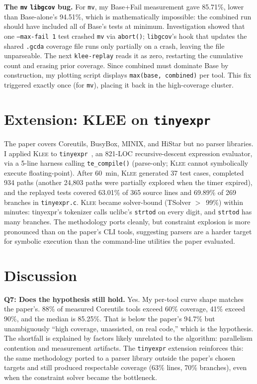 \documentclass[sigconf,nonacm,10pt]{acmart}
\newcommand{\Q}[2]{\textbf{Q#1: #2.}\;}
\begin{document}
\textbf{The \texttt{mv} \texttt{libgcov} bug.} For \texttt{mv}, my
Base+Fail measurement gave 85.71\%, lower than Base-alone's
94.51\%, which is mathematically impossible: the combined run
should have included all of Base's tests at minimum. Investigation showed
that one \texttt{--max-fail 1} test crashed \texttt{mv} via
\texttt{abort()}; \texttt{libgcov}'s hook that updates the shared
\texttt{.gcda} coverage file runs only partially on a crash,
leaving the file unparseable. The next \texttt{klee-replay} reads
it as zero, restarting the cumulative count and erasing prior
coverage. Since combined must dominate Base by construction, my
plotting script displays \texttt{max(base, combined)} per tool.
This fix triggered exactly once (for \texttt{mv}), placing it back
in the high-coverage cluster.

\section{Extension: KLEE on \texttt{tinyexpr}}

The paper covers Coreutils, BusyBox, MINIX, and HiStar but no
parser libraries. I applied \textsc{Klee} to
\texttt{tinyexpr}~\cite{tinyexpr}, an 821-LOC recursive-descent
expression evaluator, via a 5-line harness calling
\texttt{te\_compile()} (parse-only; \textsc{Klee} cannot
symbolically execute floating-point). After 60~min,
\textsc{Klee} generated 37 test cases, completed 934 paths
(another 24,803 paths were partially explored when the timer
expired), and the replayed tests covered 63.01\% of 365 source
lines and 69.89\% of 269 branches in \texttt{tinyexpr.c}.
\textsc{Klee} became solver-bound (TSolver $>$~99\%) within
minutes: tinyexpr's tokenizer calls uclibc's \texttt{strtod} on
every digit, and \texttt{strtod} has many branches. The methodology
ports cleanly, but constraint explosion is more pronounced than on
the paper's CLI tools, suggesting parsers are a harder target for
symbolic execution than the command-line utilities the paper
evaluated.

\section{Discussion}

\Q{7}{Does the hypothesis still hold} Yes. My
per-tool curve shape matches the paper's. 88\% of measured
Coreutils tools exceed 60\% coverage, 41\% exceed 90\%, and the
median is 85.25\%. That is below the paper's 94.7\% but
unambiguously ``high coverage, unassisted, on real code,'' which
is the hypothesis. The shortfall is explained by factors likely
unrelated to the algorithm: parallelism contention and measurement
artifacts. The
\texttt{tinyexpr} extension reinforces this: the same methodology
ported to a parser library outside the paper's chosen targets and
still produced respectable coverage (63\% lines, 70\% branches),
even when the constraint solver became the bottleneck.



\end{document}
